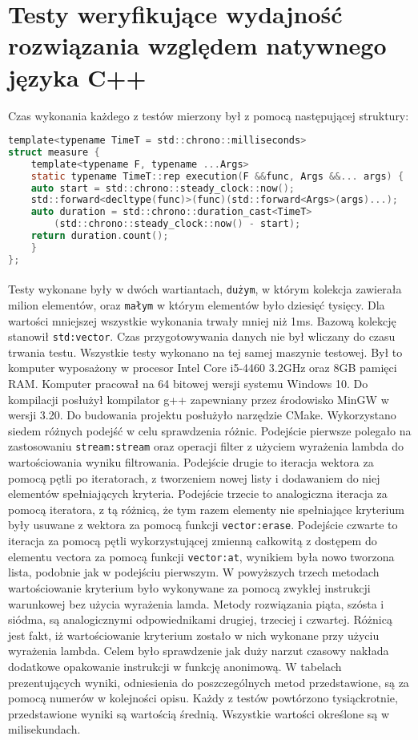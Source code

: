 \documentclass[a4paper,10pt]{report}
\begin{document}
\section{Testy weryfikujące wydajność rozwiązania względem natywnego języka C++}
Czas wykonania każdego z testów mierzony był z pomocą następującej struktury:
\begin{lstlisting}[caption={Pomiar czasu\cite{timer}},label={lst:timer},language=c]
template<typename TimeT = std::chrono::milliseconds>
struct measure {
	template<typename F, typename ...Args>
	static typename TimeT::rep execution(F &&func, Args &&... args) {
	auto start = std::chrono::steady_clock::now();
	std::forward<decltype(func)>(func)(std::forward<Args>(args)...);
	auto duration = std::chrono::duration_cast<TimeT>
		(std::chrono::steady_clock::now() - start);
	return duration.count();
	}
};
\end{lstlisting}
\paragraph{}
Testy wykonane były w dwóch wartiantach, \verb|dużym|, w którym kolekcja zawierała milion elementów, oraz \verb|małym| w którym elementów było dziesięć tysięcy. Dla wartości mniejszej wszystkie wykonania trwały mniej niż 1ms. Bazową kolekcję stanowił \verb|std:vector|. Czas przygotowywania danych nie był wliczany do czasu trwania testu. Wszystkie testy wykonano na tej samej maszynie testowej. Był to komputer wyposażony w procesor Intel Core i5-4460 3.2GHz oraz 8GB pamięci RAM. Komputer pracował na 64 bitowej wersji systemu Windows 10. Do kompilacji posłużył kompilator g++ zapewniany przez środowisko MinGW w wersji 3.20. Do budowania projektu posłużyło narzędzie CMake. 
Wykorzystano siedem różnych podejść w celu sprawdzenia różnic. Podejście pierwsze polegało na zastosowaniu \verb|stream:stream| oraz operacji filter z użyciem wyrażenia lambda do wartościowania wyniku filtrowania.
Podejście drugie to iteracja wektora za pomocą pętli po iteratorach, z tworzeniem nowej listy i dodawaniem do niej elementów spełniających kryteria.
Podejście trzecie to analogiczna iteracja za pomocą iteratora, z tą różnicą, że tym razem elementy nie spełniające kryterium były usuwane z wektora za pomocą funkcji \verb|vector:erase|.
Podejście czwarte to iteracja za pomocą pętli wykorzystującej zmienną całkowitą z dostępem do elementu vectora za pomocą funkcji \verb|vector:at|, wynikiem była nowo tworzona lista, podobnie jak w podejściu pierwszym.
W powyższych trzech metodach wartościowanie kryterium było wykonywane za pomocą zwykłej instrukcji warunkowej bez użycia wyrażenia lamda.
Metody rozwiązania piąta, szósta i siódma, są analogicznymi odpowiednikami drugiej, trzeciej i czwartej. Różnicą jest fakt, iż wartościowanie kryterium zostało w nich wykonane przy użyciu wyrażenia lambda. Celem było sprawdzenie jak duży narzut czasowy nakłada dodatkowe opakowanie instrukcji w funkcję anonimową.
W tabelach prezentujących wyniki, odniesienia do poszczególnych metod przedstawione, są za pomocą numerów w kolejności opisu.
Każdy z testów powtórzono tysiąckrotnie, przedstawione wyniki są wartością średnią. Wszystkie wartości określone są w milisekundach.
\end{document}
